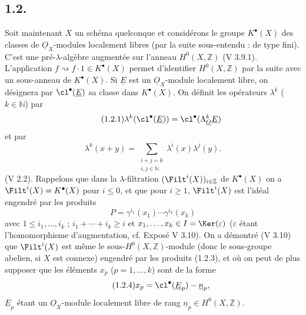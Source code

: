 
\subsection*{1.2.}
Soit maintenant $X$ un schéma quelconque et considérons le groupe $K^{\bullet}(X)$ des classes de $\underline{O}_X$-modules localement libres (par la suite sous-entendu : de type fini). C'est une pré-$\lambda$-algèbre augmentée sur l'anneau $H^0(X,\mathbb Z)$ (V 3.9.1). L'application $f\rightsquigarrow f\cdot1\in K^{\bullet}(X)$ permet d'identifier $H^0(X,\mathbb Z)$ par la suite avec un sous-anneau de $K^{\bullet}(X)$. Si $\underline{E}$ est un $\underline{O}_X$-module localement libre, on désignera par $\cl^{\bullet}(\underline{E})$ sa classe dans $K^{\bullet}(X)$. On définit les opérateurs $\lambda^k$ ($k\in\mathbb N$) par
\begin{equation}\tag{1.2.1}
\lambda^k(\cl^{\bullet}(\underline{E}))=\cl^{\bullet}(\Lambda_{\underline{O}}^k\underline{E})
\end{equation}
et par
\begin{equation}\tag{1.2.2}
\lambda^k(x+y)=\sum_{\substack{i+j=k\\ i,j\in\mathbb N}}\lambda^i(x)\lambda^j(y).
\end{equation}
(V 2.2). Rappelons que dans la $\lambda$-filtration $(\Filt^i(X))_{i\in\mathbb Z}$ de $K^{\bullet}(X)$ on a $\Filt^i(X)=K^{\bullet}(X)$ pour $i\leq0$, et que pour $i\geq1$, $\Filt^i(X)$ est l'idéal engendré par les produits
\begin{equation}\tag{1.2.3}
P=\gamma^{i_1}(x_1)\cdots\gamma^{i_k}(x_k)
\end{equation}
avec $1\leq i_1,\ldots,i_k$ ; $i_1+\cdots+i_k\geq i$ et $x_1,\ldots,x_k\in I=\Ker(\varepsilon)$ ($\varepsilon$ étant l'homomorphisme d'augmentation, cf. Exposé V 3.10). On a démontré (V 3.10) que $\Filt^i(X)$ est même le sous-$H^0(X,\mathbb Z)$-module (donc le sous-groupe abelien, si $X$ est connexe) engendré par les produits (1.2.3), et où on peut de plus supposer que les éléments $x_p$ ($p=1,\ldots,k$) sont de la forme
\begin{equation}\tag{1.2.4}
x_p=\cl^{\bullet}(\underline{E}_p)-\underline{n}_p,
\end{equation}
$\underline{E}_p$ étant un $\underline{O}_X$-module localement libre de rang $\underline{n}_p\in H^0(X,\mathbb Z)$.

